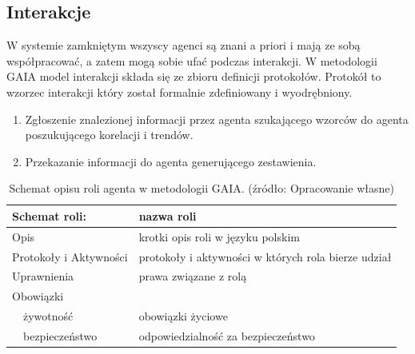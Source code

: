 \documentclass[11pt]{report}
\begin{document}
    \subsection{Interakcje}
    W systemie zamkniętym wszyscy agenci są znani a priori i mają ze sobą współpracować, a zatem mogą sobie ufać podczas interakcji.
    W metodologii GAIA model interakcji składa się ze zbioru definicji protokołów.
    Protokół to wzorzec interakcji który został formalnie zdefiniowany i wyodrębniony.

    \begin{enumerate}
        \item Zgłoszenie znalezionej informacji przez agenta szukającego wzorców do agenta poszukującego korelacji i trendów.
        \item Przekazanie informacji do agenta generującego zestawienia.
    \end{enumerate}

    \begin{table}[ht!]
        \begin{tabular}{ll}
            Schemat roli:          & nazwa roli                                          \\ \hline
            Opis                   & krotki opis roli w języku polskim                   \\
            Protokoły i Aktywności & protokoły i aktywności w których rola bierze udział \\
            Uprawnienia            & prawa związane z rolą                               \\
            Obowiązki              &                                                     \\
            ~~żywotność            & obowiązki życiowe                                   \\
            ~~bezpieczeństwo       & odpowiedzialność za bezpieczeństwo                  \\
        \end{tabular}
        \caption{Schemat opisu roli agenta w metodologii GAIA. (źródło: Opracowanie własne)}
        \label{tab:schemat roli}
    \end{table}
\end{document}

